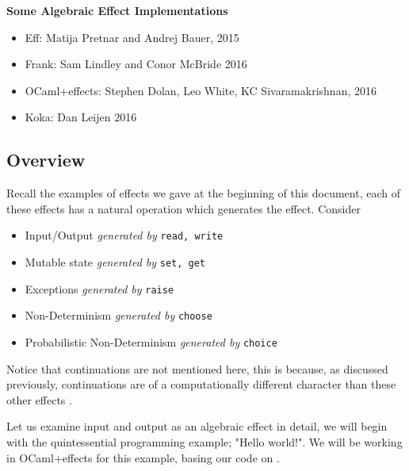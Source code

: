 \textbf{Some Algebraic Effect Implementations}
\begin{itemize}
    \item Eff: Matija Pretnar and Andrej Bauer,
        2015\cite{bauer2015programming}
    \item Frank: Sam Lindley and Conor McBride
        2016\cite{Lindley:2016vz}
    \item OCaml+effects: Stephen Dolan, Leo White, KC Sivaramakrishnan,
        2016\cite{ocamlplseff}
    \item Koka: Dan Leijen
        2016\cite{leijen:16}
\end{itemize}

\subsection{Overview}
\begin{example}
    Recall the examples of effects we gave at the beginning of this document,
    each of these effects has a natural operation which generates the effect.
    Consider
    \begin{itemize}
        \item Input/Output \textit{generated by} \texttt{read, write}
        \item Mutable state \textit{generated by} \texttt{set, get}
        \item Exceptions \textit{generated by} \texttt{raise}
        \item Non-Determinism \textit{generated by} \texttt{choose}
        \item Probabilistic Non-Determinism \textit{generated by} \texttt{choice}
    \end{itemize}
\end{example}

Notice that continuations are not mentioned here,
this is because, as discussed previously,
continuations are of a computationally different character
than these other effects
\cite{Plotkin:2002dw}\cite{hyland2007combining}.

Let us examine input and output as an algebraic effect in detail,
we will begin with the quintessential programming example; "Hello world!".
We will be working in OCaml+effects\cite{ocamlplseff} for this example,
basing our code on \cite{kceff}.\\

